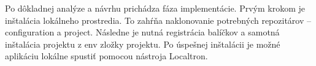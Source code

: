 
%
%
%
%
%
%
%
%
%

Po dôkladnej analýze a návrhu prichádza fáza implementácie. Prvým krokom je inštalácia lokálneho prostredia. To zahŕňa naklonovanie potrebných repozitárov -- configuration a project. Následne je nutná registrácia balíčkov a samotná inštalácia projektu z env zložky projektu. Po úspešnej inštalácii je možné aplikáciu lokálne spustiť pomocou nástroja Localtron.


